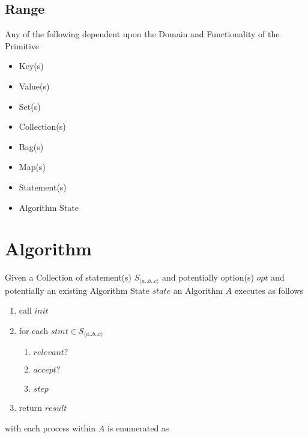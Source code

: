 \documentclass[../main.tex]{subfiles}
\begin{document}
\subsection{Range}
Any of the following dependent upon the Domain and Functionality of the Primitive

\begin{itemize}
\item Key(s)
\item Value(s)
\item Set(s)
\item Collection(s)
\item Bag(s)
\item Map(s)
\item Statement(s)
\item Algorithm State
\end{itemize}

\section{Algorithm}
Given a Collection of statement(s) $S_{\langle a..b..c \rangle}$ and potentially option(s) $opt$ and potentially an existing Algorithm State $state$ an Algorithm $A$ executes as follows

\begin{enumerate}
\item call $init$
\item for each $stmt \in S_{\langle a..b..c \rangle}$
  \begin{enumerate}
  \item $relevant?$
  \item $accept?$
  \item $step$
  \end{enumerate}
\item return $result$
\end{enumerate}
with each process within $A$ is enumerated as
\end{document}
